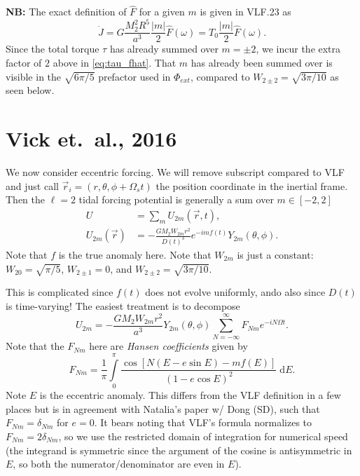 \documentclass[11pt,
        usenames, %
        dvipsnames %
    ]{article}
\newcommand*{\abs}[1]{\left|#1\right|}
\newcommand*{\p}[1]{\left(#1\right)}
\newcommand*{\s}[1]{\left[#1\right]}
\begin{document}
\textbf{NB:} The exact definition of $\hat{F}$ for a given $m$ is given in
VLF.23 as
\begin{equation}
    \dot{J} = G\frac{M_2^2R^5}{a^3}\frac{\abs{m}}{2}\hat{F}(\omega)
        = T_0 \frac{\abs{m}}{2} \hat{F}(\omega).
\end{equation}
Since the total torque $\tau$ has already summed over $m = \pm 2$, we incur the
extra factor of $2$ above in \autoref{eq:tau_fhat}. That $m$ has already been
summed over is visible in the $\sqrt{6\pi/5}$ prefactor used in $\Phi_{ext}$,
compared to $W_{2\pm 2} = \sqrt{3\pi/10}$ as seen below.

\section{Vick et.\ al., 2016}

We now consider eccentric forcing. We will remove subscript compared to VLF and
just call $\vec{r}_i = \p{r, \theta, \phi + \Omega_s t}$ the position
coordinate in the inertial frame. Then the $\ell = 2$ tidal forcing potential is
generally a sum over $m \in [-2, 2]$
\begin{align}
    U &= \sum\limits_m U_{2m} \p{\vec{r}, t},\\
    U_{2m}\p{\vec{r}} &= -\frac{GM_2 W_{2m} r^2}{D(t)^3}
        e^{-imf(t)} Y_{2m}(\theta, \phi).
\end{align}
Note that $f$ is the true anomaly here. Note that $W_{2m}$ is just a constant:
$W_{20} = \sqrt{\pi/5}$, $W_{2 \pm 1} = 0$, and $W_{2 \pm 2} = \sqrt{3\pi /
10}$.

This is complicated since $f(t)$ does not evolve uniformly, ando also since
$D(t)$ is time-varying! The easiest treatment is to decompose
\begin{equation}
    U_{2m} = -\frac{GM_2W_{2m}r^2}{a^3}Y_{2m}\p{\theta, \phi}
        \sum\limits_{N = -\infty}^\infty F_{Nm}e^{-iN\Omega t}.
\end{equation}
Note that the $F_{Nm}$ here are \emph{Hansen coefficients} given by
\begin{equation}
    F_{Nm} = \frac{1}{\pi}\int\limits_{0}^{\pi}
        \frac{\cos\s{N\p{E - e\sin E} - mf(E)}}
            {\p{1 - e\cos E}^2}\;\mathrm{d}E.
\end{equation}
Note $E$ is the eccentric anomaly. This differs from the VLF definition in a few
places but is in agreement with Natalia's paper w/ Dong (SD), such that $F_{Nm}
= \delta_{Nm}$ for $e = 0$. It bears noting that VLF's formula normalizes to
$F_{Nm} = 2\delta_{Nm}$, so we use the restricted domain of integration for
numerical speed (the integrand is symmetric since the argument of the cosine is
antisymmetric in $E$, so both the numerator/denominator are even in $E$).
\end{document}
